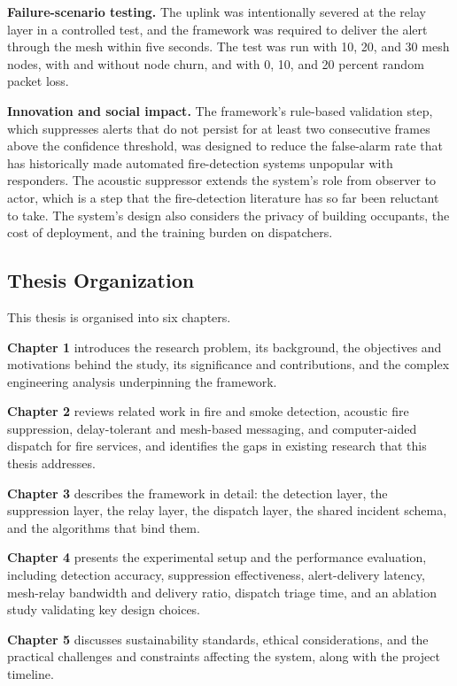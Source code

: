 \textbf{Failure-scenario testing.} The uplink was intentionally severed at the relay layer in a controlled test, and the framework was required to deliver the alert through the mesh within five seconds. The test was run with 10, 20, and 30 mesh nodes, with and without node churn, and with 0, 10, and 20 percent random packet loss.

\textbf{Innovation and social impact.} The framework's rule-based validation step, which suppresses alerts that do not persist for at least two consecutive frames above the confidence threshold, was designed to reduce the false-alarm rate that has historically made automated fire-detection systems unpopular with responders. The acoustic suppressor extends the system's role from observer to actor, which is a step that the fire-detection literature has so far been reluctant to take. The system's design also considers the privacy of building occupants, the cost of deployment, and the training burden on dispatchers.

\subsection{Thesis Organization}

This thesis is organised into six chapters.

\textbf{Chapter 1} introduces the research problem, its background, the objectives and motivations behind the study, its significance and contributions, and the complex engineering analysis underpinning the framework.

\textbf{Chapter 2} reviews related work in fire and smoke detection, acoustic fire suppression, delay-tolerant and mesh-based messaging, and computer-aided dispatch for fire services, and identifies the gaps in existing research that this thesis addresses.

\textbf{Chapter 3} describes the framework in detail: the detection layer, the suppression layer, the relay layer, the dispatch layer, the shared incident schema, and the algorithms that bind them.

\textbf{Chapter 4} presents the experimental setup and the performance evaluation, including detection accuracy, suppression effectiveness, alert-delivery latency, mesh-relay bandwidth and delivery ratio, dispatch triage time, and an ablation study validating key design choices.

\textbf{Chapter 5} discusses sustainability standards, ethical considerations, and the practical challenges and constraints affecting the system, along with the project timeline.

